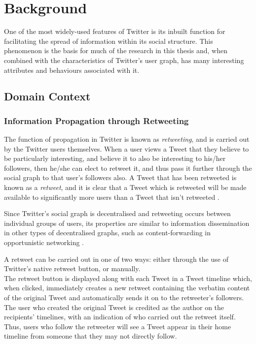 \chapter{Background}


One of the most widely-used features of Twitter is its inbuilt function for facilitating the spread of information within its social structure. This phenomenon is the basis for much of the research in this thesis and, when combined with the characteristics of Twitter's user graph, has many interesting attributes and behaviours associated with it.


\section{Domain Context}

\subsection{Information Propagation through Retweeting}
The function of propagation in Twitter is known as \textit{retweeting}, and is carried out by the Twitter users themselves. When a user views a Tweet that they believe to be particularly interesting, and believe it to also be interesting to his/her followers, then he/she can elect to retweet it, and thus pass it further through the social graph to that user's followers also. A Tweet that has been retweeted is known as a \textit{retweet}, and it is clear that a Tweet which is retweeted will be made available to significantly more users than a Tweet that isn't retweeted \cite{webberley11} \cite{kwak10}.

Since Twitter's social graph is decentralised and retweeting occurs between individual groups of users, its properties are similar to information dissemination in other types of decentralised graphs, such as content-forwarding in opportunistic networking \cite{allen10}.

A retweet can be carried out in one of two ways: either through the use of Twitter's native retweet button, or manually. \\
The retweet button is displayed along with each Tweet in a Tweet timeline which, when clicked, immediately creates a new retweet containing the verbatim content of the original Tweet and automatically sends it on to the retweeter's followers.\\ The user who created the original Tweet is credited as the author on the recipients' timelines, with an indication of who carried out the retweet itself. Thus, users who follow the retweeter will see a Tweet appear in their home timeline from someone that they may not directly follow.\\

